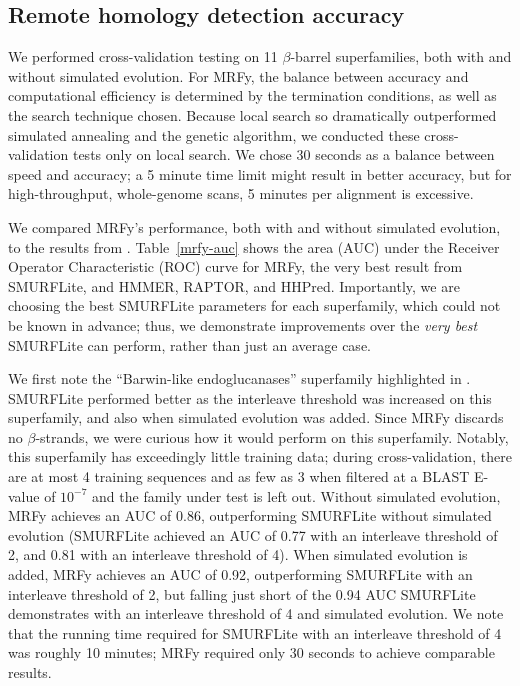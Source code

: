 \documentclass{acm_proc_article-sp}
\begin{document}
\subsection{Remote homology detection accuracy}

We performed cross-validation testing on 11 $\beta$-barrel superfamilies, both
with and without simulated evolution.
For MRFy, the balance between accuracy and computational efficiency is 
determined by the termination conditions, as well as the search technique 
chosen.
Because local search so dramatically outperformed simulated annealing and the
genetic algorithm, we conducted these cross-validation tests only on local 
search.
We chose 30 seconds as a balance between speed and accuracy; a 5 minute time
limit might result in better accuracy, but for high-throughput, whole-genome 
scans, 5 minutes per alignment is excessive.

We compared MRFy's performance, both with and without simulated evolution, to 
the results from \citet{Daniels:2012dg}.
Table~\ref{mrfy-auc} shows the area (AUC) under the Receiver Operator 
Characteristic (ROC) curve for MRFy, the very best result from SMURFLite, and
HMMER, RAPTOR, and HHPred.
Importantly, we are choosing the best SMURFLite parameters for each superfamily,
which could not be known in advance; thus, we demonstrate improvements over the
\emph{very best} SMURFLite can perform, rather than just an average case.

We first note the ``Barwin-like endoglucanases'' superfamily highlighted in
\citet{Daniels:2012dg}.
SMURFLite performed better as the interleave threshold was increased on this
superfamily, and also when simulated evolution was added.
Since MRFy discards no $\beta$-strands, we were curious how it would perform
on this superfamily.
Notably, this superfamily has exceedingly little training data; during 
cross-validation, there are at most 4 training sequences and as few as 3
when filtered at a BLAST E-value of $10^{-7}$ and the family under test is left
out.
Without simulated evolution, MRFy achieves an AUC of 0.86, outperforming 
SMURFLite
without simulated evolution (SMURFLite achieved an AUC of 0.77 with an 
interleave threshold of 2, and 0.81 with an interleave threshold of 4).
When simulated evolution is added, MRFy achieves an AUC of 0.92, outperforming
SMURFLite with an interleave threshold of 2, but falling just short of the 0.94
AUC SMURFLite demonstrates with an interleave threshold of 4 and simulated 
evolution.
We note that the running time required for SMURFLite with an interleave
threshold of 4 was roughly 10 minutes; MRFy required only 30 seconds to achieve
comparable results.
\end{document}
